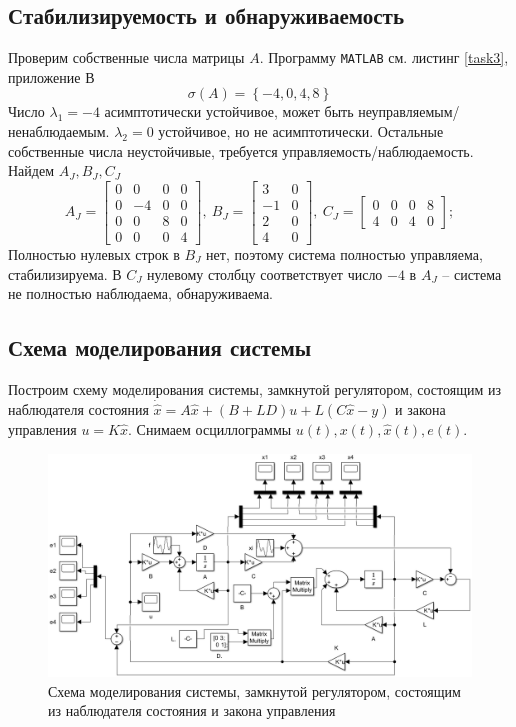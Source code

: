 \documentclass[a4paper, 12pt]{article}
\begin{document}
    \subsection{Стабилизируемость и обнаруживаемость}
    Проверим собственные числа матрицы $A$. Программу \texttt{MATLAB} см. листинг \ref{task3}, приложение В
    $$
    \sigma\left( A \right)=\left\{ -4,0,4,8 \right\}
    $$
    Число $\lambda_1=-4$ асимптотически устойчивое, может быть неуправляемым/ненаблюдаемым.
    $\lambda_2=0$ устойчивое, но не асимптотически. Остальные собственные числа неустойчивые,
    требуется управляемость/наблюдаемость. Найдем $A_J,B_J,C_J$
    $$
    A_J=\begin{bmatrix}
        0     &0     &0     &0\\
     0    &-4     &0     &0\\
     0     &0     &8     &0\\
     0     &0     &0     &4
    \end{bmatrix},\ B_J=\begin{bmatrix}
        3     &0\\
    -1     &0\\
     2     &0\\
     4     &0
    \end{bmatrix},\ C_J=\begin{bmatrix}
        0     &0     &0     &8\\
     4     &0     &4     &0
    \end{bmatrix};
    $$
    Полностью нулевых строк в $B_J$ нет, поэтому система полностью управляема,
    стабилизируема. В $C_J$ нулевому столбцу соответствует число $-4$ в $A_J$ --
    система не полностью наблюдаема, обнаруживаема.


    \subsection{Схема моделирования системы}
    Построим схему моделирования системы, замкнутой регулятором, состоящим из
    наблюдателя состояния $\dot{\hat{x}}=A\hat{x}+\left(B+LD\right)u+L\left(C\hat{x}-y\right)$ и закона управления $u=K\hat{x}$.
    Снимаем осциллограммы $u(t),x(t),\hat{x}(t),e(t)$.
    \begin{figure}[H]
        \centering
        \includegraphics[scale=0.4]{3task_scheme.png}
        \captionsetup{skip=0pt}
        \caption{Схема моделирования системы, замкнутой регулятором, состоящим из наблюдателя состояния и закона управления}
        \label{fig:3task_scheme}
    \end{figure}
    
\end{document}
